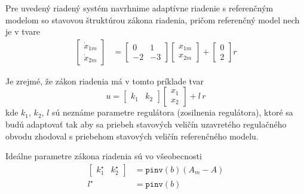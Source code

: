 \documentclass[a4paper, 10pt, ]{article}
\begin{document}
Pre uvedený riadený systém navrhnime adaptívne riadenie s referenčným modelom so stavovou štruktúrou zákona riadenia, pričom referenčný model nech je v tvare
\begin{subequations}
	\begin{align}
	\begin{bmatrix}
	 		\dot x_{1m}  \\
	 		\dot x_{2m}
	 \end{bmatrix}
	 &=
	 \begin{bmatrix}
	 		0 & 1 \\
	 		-2 & -3
	 \end{bmatrix}
	 \begin{bmatrix}
	 		x_{1m}  \\
	 		x_{2m}
	 \end{bmatrix}
	 +
	 \begin{bmatrix}
	 		0  \\
	 		2
	 \end{bmatrix}
	 r
	 \label{stavovyOpisRM2R_priklad2}
	\end{align}
\end{subequations}



Je zrejmé, že zákon riadenia má v tomto príklade tvar
\begin{equation} \label{stavZakRiad2r_priklad2}
	u
	=
	\begin{bmatrix} k_1 & k_2 \end{bmatrix}
	\begin{bmatrix} x_1 \\ x_2 \end{bmatrix}
	+
	l \, r
\end{equation}
kde $k_1$, $k_2$, $l$ sú neznáme parametre regulátora (zosilnenia regulátora), ktoré sa budú adaptovať tak aby sa priebeh stavových veličín uzavretého regulačného obvodu zhodoval s priebehom stavových veličín referenčného modelu.

Ideálne parametre zákona riadenia sú vo všeobecnosti
\begin{align}
    \begin{bmatrix} k_1^\star & k_2^\star \end{bmatrix}
    &=
    \texttt{pinv}(b) \left( A_m - A \right)
    \\
    l^\star &= \texttt{pinv}(b)
\end{align}
\end{document}
